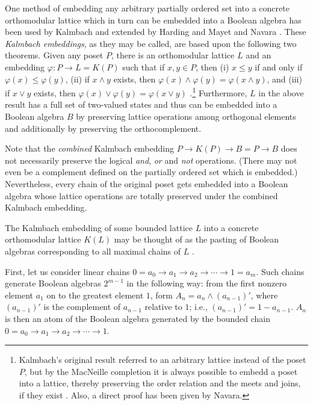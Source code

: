 \documentclass[%
  preprint,
 showpacs,
 showkeys,
 preprintnumbers,
 amsmath,amssymb,
 aps,
 rmp,
  longbibliography,
 ]{revtex4-1}
\begin{document}
One method of embedding any arbitrary partially ordered set into a
concrete orthomodular lattice which in turn can be embedded into a
Boolean algebra has been used by Kalmbach \cite{kalmbach-77} and
extended by Harding \cite{harding-91} and Mayet and Navara
\cite{navara-95}. These
{\it Kalmbach embeddings}, as they may be called, are based upon the
following two theorems.
Given any poset $P$,
 there is an orthomodular lattice $L$ and an
embedding $\varphi :P\rightarrow L=K(P)$ such that if $x,y\in P$, then
(i) $x\le y$ if and only if $\varphi (x)\le \varphi (y)$,
(ii) if $x\wedge y$ exists, then
$\varphi (x)\wedge \varphi (y)=\varphi (x \wedge y)$,    and
(iii) if $x\vee y$ exists, then
$\varphi (x)\vee \varphi (y)=\varphi (x \vee y)$
\cite{kalmbach-77}.\footnote{Kalmbach's original result referred to
an arbitrary lattice instead of the poset $P$, but by the MacNeille
 completion \cite{macneille} it is always possible
to embedd a poset into a lattice, thereby  preserving the order relation
and the meets and joins, if they exist \cite{harding-priv}.
Also, a direct proof has been given by Navara.}
Furthermore, $L$ in the above result has a full set of two-valued states
\cite{harding-91,navara-95} and thus can be embedded into a Boolean
algebra $B$ by preserving lattice operations among orthogonal elements
and additionally by preserving the orthocomplement.


Note that the {\em combined}  Kalmbach embedding $P\rightarrow
K(P) \rightarrow B = P\rightarrow B$ does not necessarily preserve the
logical
{\it and},
{\it
or} and {\it not} operations.
(There may not even be a complement defined on the
partially ordered set which is embedded.)
Nevertheless, every chain of the original poset gets embedded into a
Boolean algebra whose lattice operations are totally preserved under the
combined Kalmbach embedding.


The Kalmbach embedding of some bounded lattice $L$ into a concrete
orthomodular lattice
$K(L)$ may be thought of as the pasting of Boolean algebras
corresponding to all maximal chains of $L$ \cite{harding-priv}.

First, let us consider  linear chains
$0=a_0\rightarrow
a_1\rightarrow a_2\rightarrow \cdots \rightarrow 1=a_m$.
Such chains
generate Boolean algebras $2^{m-1}$ in the following way: from the first
nonzero element $a_1$ on to the greatest element $1$, form
$A_n=a_n\wedge (a_{n-1})'$, where $(a_{n-1})'$ is the complement of $a_{n-1}$
relative to $1$; i.e., $(a_{n-1})'=1-a_{n-1}$.  $A_n$ is then an atom of the
Boolean algebra generated by the bounded chain
$0=a_0\rightarrow
a_1\rightarrow a_2\rightarrow \cdots \rightarrow 1$.
\end{document}
